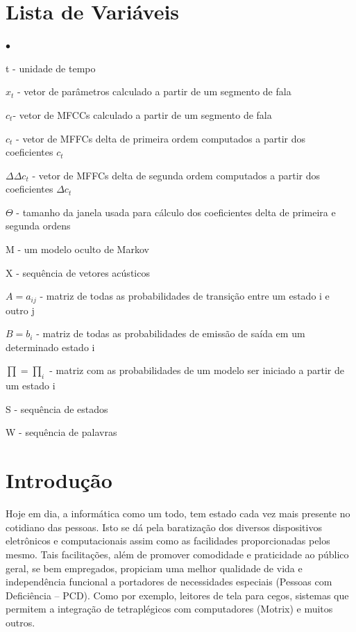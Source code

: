 \documentclass[12pt,a4paper,oneside]{report}
\begin{document}
\chapter*{Lista de Variáveis}
\begin{list}{$\bullet$}{}
\item[] t - unidade de tempo
\item[] $x_{t}$ - vetor de parâmetros calculado a partir de um segmento de fala
\item[] $c_{t}$- vetor de MFCCs calculado a partir de um segmento de fala
\item[] $c_{t}$ - vetor de MFFCs delta de primeira ordem computados a partir dos coeficientes $c_{t}$
\item[] $\Delta\Delta c_{t}$ - vetor de MFFCs delta de segunda ordem computados a partir dos coeficientes $\Delta c_{t}$
\item[] $\Theta$ - tamanho da janela usada para cálculo dos coeficientes delta de primeira e segunda ordens
\item[] M - um modelo oculto de Markov
\item[] X - sequência de vetores acústicos
\item[] $A = a_{ij}$ - matriz de todas as probabilidades de transição entre um estado i e outro j
\item[] $B = b_{i}$ - matriz de todas as probabilidades de emissão de saída em um determinado estado i
\item[] $\prod = \prod_{i}$ - matriz com as probabilidades de um modelo ser iniciado a partir de um estado i
\item[] S - sequência de estados
\item[] W - sequência de palavras
\end{list}

\tableofcontents

\listoffigures

\listoftables


\chapter{Introdução}

Hoje em dia, a informática como um todo, tem estado cada vez mais presente no cotidiano das pessoas. Isto se dá pela baratização dos diversos dispositivos eletrônicos e computacionais assim como as facilidades proporcionadas pelos mesmo. Tais facilitações, além de promover comodidade e praticidade ao público geral, se bem empregados, propiciam uma melhor qualidade de vida e independência funcional a portadores de necessidades especiais (Pessoas com Deficiência – PCD). Como por exemplo, leitores de tela para cegos, sistemas que permitem a integração de tetraplégicos com computadores (Motrix) e muitos outros.
\end{document}
